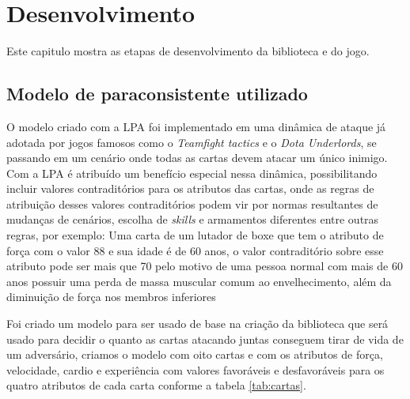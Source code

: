 
\chapter{Desenvolvimento}

Este capitulo mostra as etapas de desenvolvimento da biblioteca e do jogo.

\section{Modelo de paraconsistente utilizado}

O modelo criado com a LPA foi implementado em uma dinâmica de ataque já adotada por jogos famosos como o \textit{Teamfight tactics} e o \textit{Dota Underlords}, se passando em um cenário onde todas as cartas devem atacar um único inimigo. Com a LPA é atribuído um benefício especial nessa dinâmica, possibilitando incluir valores contraditórios para os atributos das cartas, onde as regras de atribuição desses valores contraditórios podem vir por normas resultantes de mudanças de cenários, escolha de \textit{skills} e armamentos diferentes entre outras regras, por exemplo: Uma carta de um lutador de boxe que tem o atributo de força com o valor 88 e sua idade é de 60 anos, o valor contraditório sobre esse atributo pode ser mais que 70 pelo motivo de uma pessoa normal com mais de 60 anos possuir uma perda de massa muscular comum ao envelhecimento, além da diminuição de força nos membros inferiores

Foi criado um modelo para ser usado de base na criação da biblioteca que será usado para decidir o quanto as cartas atacando juntas conseguem tirar de vida de um adversário, criamos o modelo  com oito cartas e com os atributos de força, velocidade, cardio e experiência com valores favoráveis e desfavoráveis para os quatro atributos de cada carta conforme a tabela \ref{tab:cartas}.

\newpage

